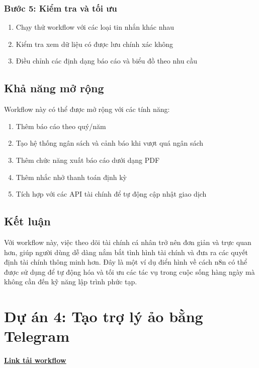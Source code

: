 \subsubsection{Bước 5: Kiểm tra và tối ưu}
\begin{enumerate}
    \item Chạy thử workflow với các loại tin nhắn khác nhau
    \item Kiểm tra xem dữ liệu có được lưu chính xác không
    \item Điều chỉnh các định dạng báo cáo và biểu đồ theo nhu cầu
\end{enumerate}

\subsection{Khả năng mở rộng}

Workflow này có thể được mở rộng với các tính năng:
\begin{enumerate}
    \item Thêm báo cáo theo quý/năm
    \item Tạo hệ thống ngân sách và cảnh báo khi vượt quá ngân sách
    \item Thêm chức năng xuất báo cáo dưới dạng PDF
    \item Thêm nhắc nhở thanh toán định kỳ
    \item Tích hợp với các API tài chính để tự động cập nhật giao dịch
\end{enumerate}

\subsection{Kết luận}

Với workflow này, việc theo dõi tài chính cá nhân trở nên đơn giản và trực quan hơn, giúp người dùng dễ dàng nắm bắt tình hình tài chính và đưa ra các quyết định tài chính thông minh hơn. Đây là một ví dụ điển hình về cách n8n có thể được sử dụng để tự động hóa và tối ưu các tác vụ trong cuộc sống hàng ngày mà không cần đến kỹ năng lập trình phức tạp.

\clearpage
\section{\textbf{Dự án 4: Tạo trợ lý ảo bằng Telegram }}

\href{https://drive.google.com/drive/folders/1-qVA3yQnfIx70DsZKdPAGYQcr8WftkGJ?usp=sharing}{\textbf{\underline {Link tải workflow}}}

